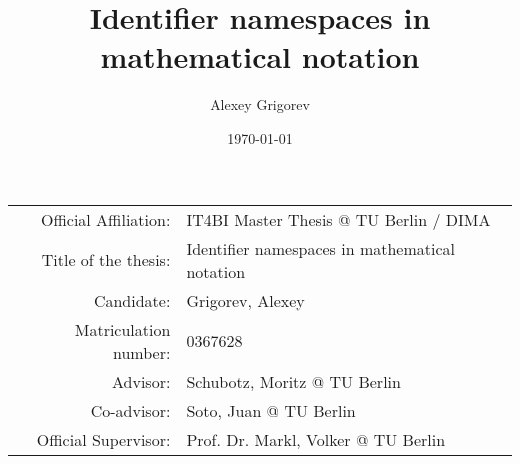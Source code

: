 
\title{Identifier namespaces in mathematical notation}
\author{Alexey Grigorev}
\date{\today}
\maketitle


\begin{tabular}{|r|l|}
  \hline
  Official Affiliation: & IT4BI Master Thesis @ TU Berlin / DIMA \\
  Title of the thesis: & Identifier namespaces in mathematical notation \\
  Candidate: & Grigorev, Alexey \\
  Matriculation number: & 0367628 \\
  Advisor:  & Schubotz, Moritz @ TU Berlin \\
  Co-advisor: & Soto, Juan @ TU Berlin \\
  Official Supervisor: &  Prof. Dr. Markl, Volker @ TU Berlin \\
  \hline
\end{tabular}